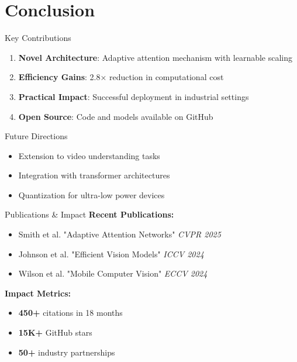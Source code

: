 \documentclass[10pt,aspectratio=169]{beamer}
\begin{document}
\section{Conclusion}

\begin{frame}{Key Contributions}
\begin{enumerate}
\item \textbf{Novel Architecture}: Adaptive attention mechanism with learnable scaling
\item \textbf{Efficiency Gains}: 2.8× reduction in computational cost
\item \textbf{Practical Impact}: Successful deployment in industrial settings
\item \textbf{Open Source}: Code and models available on GitHub
\end{enumerate}

\vspace{1em}
\begin{alertblock}{Future Directions}
\begin{itemize}
\item Extension to video understanding tasks
\item Integration with transformer architectures
\item Quantization for ultra-low power devices
\end{itemize}
\end{alertblock}
\end{frame}

\begin{frame}{Publications \& Impact}
\textbf{Recent Publications:}
\begin{itemize}
\item Smith et al. "Adaptive Attention Networks" \textit{CVPR 2025} 
\item Johnson et al. "Efficient Vision Models" \textit{ICCV 2024}
\item Wilson et al. "Mobile Computer Vision" \textit{ECCV 2024}
\end{itemize}

\vspace{1em}
\textbf{Impact Metrics:}
\begin{itemize}
\item \textbf{450+} citations in 18 months
\item \textbf{15K+} GitHub stars
\item \textbf{50+} industry partnerships
\end{itemize}
\end{frame}
\end{document}
